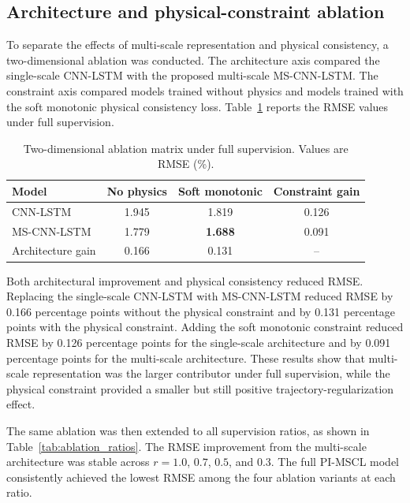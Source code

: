 \documentclass[pdflatex,sn-mathphys-num]{sn-jnl}
\begin{document}
\subsection{Architecture and physical-constraint ablation}
\label{subsec:ablation_results}

To separate the effects of multi-scale representation and physical consistency, a two-dimensional ablation was conducted. The architecture axis compared the single-scale CNN-LSTM with the proposed multi-scale MS-CNN-LSTM. The constraint axis compared models trained without physics and models trained with the soft monotonic physical consistency loss. Table~\ref{tab:ablation_matrix_full} reports the RMSE values under full supervision.

\begin{table}[t]
\caption{Two-dimensional ablation matrix under full supervision. Values are RMSE (\%).}
\label{tab:ablation_matrix_full}
\centering
\begin{tabular}{lccc}
\toprule
Model & No physics & Soft monotonic & Constraint gain \\
\midrule
CNN-LSTM & 1.945 & 1.819 & 0.126 \\
MS-CNN-LSTM & 1.779 & \textbf{1.688} & 0.091 \\
Architecture gain & 0.166 & 0.131 & -- \\
\bottomrule
\end{tabular}
\end{table}

Both architectural improvement and physical consistency reduced RMSE. Replacing the single-scale CNN-LSTM with MS-CNN-LSTM reduced RMSE by 0.166 percentage points without the physical constraint and by 0.131 percentage points with the physical constraint. Adding the soft monotonic constraint reduced RMSE by 0.126 percentage points for the single-scale architecture and by 0.091 percentage points for the multi-scale architecture. These results show that multi-scale representation was the larger contributor under full supervision, while the physical constraint provided a smaller but still positive trajectory-regularization effect.

The same ablation was then extended to all supervision ratios, as shown in Table~\ref{tab:ablation_ratios}. The RMSE improvement from the multi-scale architecture was stable across $r=1.0$, $0.7$, $0.5$, and $0.3$. The full PI-MSCL model consistently achieved the lowest RMSE among the four ablation variants at each ratio.
\end{document}
